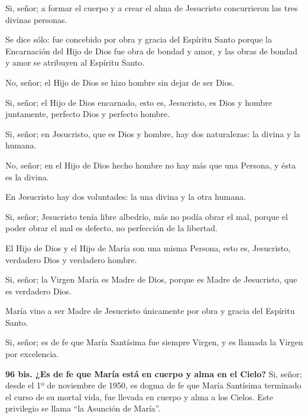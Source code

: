  Si, señor; a formar el cuerpo y a crear el alma de Jesucristo
concurrieron las tres divinas personas.

 Se dice sólo: fue concebido por obra y gracia del
Espíritu Santo porque la Encarnación del Hijo de Dios fue obra de bondad y
amor, y las obras de bondad y amor se atribuyen al Espíritu Santo.

 No, señor; el
Hijo de Dios se hizo hombre sin dejar de ser Dios.

 Si, señor; el Hijo de
Dios encarnado, esto es, Jesucristo, es Dios y hombre juntamente, perfecto Dios
y perfecto hombre.

 Si, señor; en Jesucristo, que
es Dios y hombre, hay dos naturalezas: la divina y la humana.

 No,
señor; en el Hijo de Dios hecho hombre no hay más que una Persona, y ésta es la
divina.

 En Jesucristo hay dos
voluntades: la una divina y la otra humana.

 Si, señor; Jesucristo tenía libre albedrío,
más no podía obrar el mal, porque el poder obrar el mal es defecto, no perfección
de la libertad.

 El Hijo
de Dios y el Hijo de María son una misma Persona, esto es, Jesucristo, verdadero
Dios y verdadero hombre.

 Si, señor; la Virgen María es Madre
de Dios, porque es Madre de Jesucristo, que es verdadero Dios.

 María vino a
ser Madre de Jesucristo únicamente por obra y gracia del Espíritu Santo.

 Si, señor; es de fe que María
Santísima fue siempre Virgen, y es llamada la Virgen por excelencia.

\textbf{96 bis. ¿Es de fe que María está en cuerpo y alma en el Cielo?} Si, señor;
desde el 1º de noviembre de 1950, es dogma de fe que María Santísima terminado
el curso de su mortal vida, fue llevada en cuerpo y alma a los Cielos. Este
privilegio se llama “la Asunción de María”.

